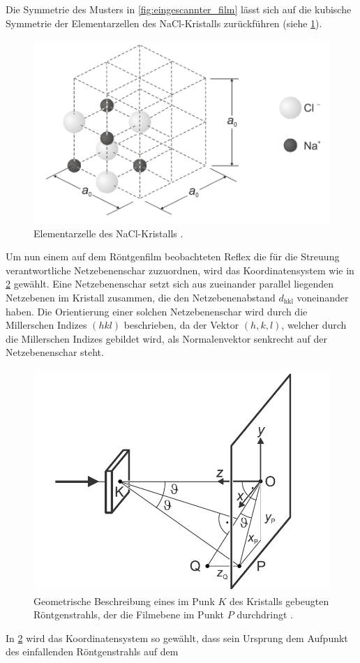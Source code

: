 Die Symmetrie des Musters in \cref{fig:eingescannter_film} lässt sich auf die kubische Symmetrie der Elementarzellen des NaCl-Kristalls zurückführen (siehe \cref{fig:elementarzelle_nacl}).
\begin{figure}[H]
	\centering
	\includegraphics[width=0.6\linewidth]{../figs/elementarzelle_nacl.png}
	\caption{Elementarzelle des NaCl-Kristalls \cite{laue_handblatt}.}
	\label{fig:elementarzelle_nacl}
\end{figure}
Um nun einem auf dem Röntgenfilm beobachteten Reflex die für die Streuung verantwortliche Netzebenenschar zuzuordnen, wird das Koordinatensystem wie in \cref{fig:skizze}
gewählt. Eine Netzebenenschar setzt sich aus zueinander parallel liegenden Netzebenen im Kristall zusammen, die den Netzebenenabstand $d_{\mathrm{hkl}}$ voneinander haben.
Die Orientierung einer solchen Netzebenenschar wird durch die Millerschen Indizes $(hkl)$ beschrieben, da der Vektor $(h,k,l)$, welcher durch die
Millerschen Indizes gebildet wird, als Normalenvektor senkrecht auf der Netzebenenschar steht. 
\begin{figure}[H]
	\centering
	\includegraphics[width=0.6\linewidth]{../figs/skizze.png}
	\caption{Geometrische Beschreibung eines im Punk $K$ des Kristalls gebeugten Röntgenstrahls, der die Filmebene im Punkt $P$ durchdringt \cite{laue_handblatt}.}
	\label{fig:skizze}
\end{figure} In \cref{fig:skizze} wird das Koordinatensystem so gewählt, dass sein Ursprung dem Aufpunkt des einfallenden Röntgenstrahls auf dem
